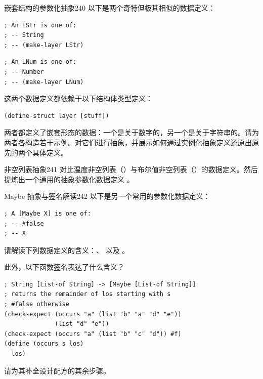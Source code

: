 \begin{exercise}{嵌套结构的参数化抽象}{240}
以下是两个奇特但极其相似的数据定义：

\begin{stepperbox}
  \noindent\begin{minipage}[t]{0.48\linewidth}\vspace{0pt}
\begin{Verbatim}[commandchars=\\\{\}, fontsize=\fontsize{6.0pt}{7.2pt}\selectfont]
; An LStr is one of:
; -- String
; -- (make-layer LStr)
\end{Verbatim}
  \end{minipage}\hfill
  \begin{minipage}[t]{0.48\linewidth}\vspace{0pt}
\begin{Verbatim}[commandchars=\\\{\}, fontsize=\fontsize{6.0pt}{7.2pt}\selectfont]
; An LNum is one of:
; -- Number
; -- (make-layer LNum)
\end{Verbatim}
  \end{minipage}
\end{stepperbox}

这两个数据定义都依赖于以下结构体类型定义：

\begin{lstlisting}[language=BSL]
(define-struct layer [stuff])
\end{lstlisting}

两者都定义了嵌套形态的数据：一个是关于数字的，另一个是关于字符串的。请为两者各构造若干示例。对它们进行抽象，并展示如何通过实例化抽象定义还原出原先的两个具体定义。
\end{exercise}

\begin{exercise}{非空列表抽象}{241}
对比温度非空列表（）与布尔值非空列表（）的数据定义。然后提炼出一个通用的抽象参数化数据定义 。
\end{exercise}

\begin{exercise}{Maybe 抽象与签名解读}{242}
以下是另一个常用的参数化数据定义：

\begin{lstlisting}[language=BSL]
; A [Maybe X] is one of:
; -- #false
; -- X
\end{lstlisting}

请解读下列数据定义的含义：、 以及 。

此外，以下函数签名表达了什么含义？

\begin{lstlisting}[language=BSL, basicstyle=\scriptsize\ttfamily]
; String [List-of String] -> [Maybe [List-of String]]
; returns the remainder of los starting with s
; #false otherwise
(check-expect (occurs "a" (list "b" "a" "d" "e"))
              (list "d" "e"))
(check-expect (occurs "a" (list "b" "c" "d")) #f)
(define (occurs s los)
  los)
\end{lstlisting}

请为其补全设计配方的其余步骤。
\end{exercise}

